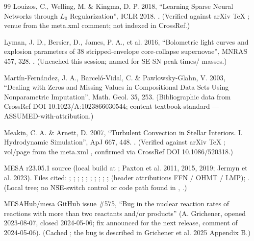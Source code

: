 \begin{thebibliography}{99}
Louizos, C., Welling, M. \& Kingma, D. P. 2018, ``Learning Sparse Neural Networks through $L_0$ Regularization'', ICLR 2018. . (Verified against arXiv TeX ; venue from the meta.xml comment; not indexed in CrossRef.)

Lyman, J. D., Bersier, D., James, P. A., et al. 2016, ``Bolometric light curves and explosion parameters of 38 stripped-envelope core-collapse supernovae'', MNRAS 457, 328. . (Uncached this session; named for SE-SN peak times/ masses.)

Mart\'in-Fern\'andez, J. A., Barcel\'o-Vidal, C. \& Pawlowsky-Glahn, V. 2003, ``Dealing with Zeros and Missing Values in Compositional Data Sets Using Nonparametric Imputation'', Math. Geol. 35, 253. (Bibliographic data from CrossRef DOI 10.1023/A:1023866030544; content textbook-standard --- ASSUMED-with-attribution.)

Meakin, C. A. \& Arnett, D. 2007, ``Turbulent Convection in Stellar Interiors. I. Hydrodynamic Simulation'', ApJ 667, 448. . (Verified against arXiv TeX ; vol/page from the meta.xml , confirmed via CrossRef DOI 10.1086/520318.)

MESA r23.05.1 source (local build at ; Paxton et al. 2011, 2015, 2019; Jermyn et al. 2023). Files cited: ; ; ; ; ; ; ; ; ; ;  (header attributions FFN / OHMT / LMP); . (Local tree; no NSE-switch control or code path found in , .)

MESAHub/mesa GitHub issue \#575, ``Bug in the nuclear reaction rates of reactions with more than two reactants and/or products'' (A. Grichener, opened 2023-08-07, closed 2024-05-06; fix announced for the next release, comment of 2024-05-06). (Cached ; the bug is described in Grichener et al. 2025 Appendix B.)


\end{thebibliography}
